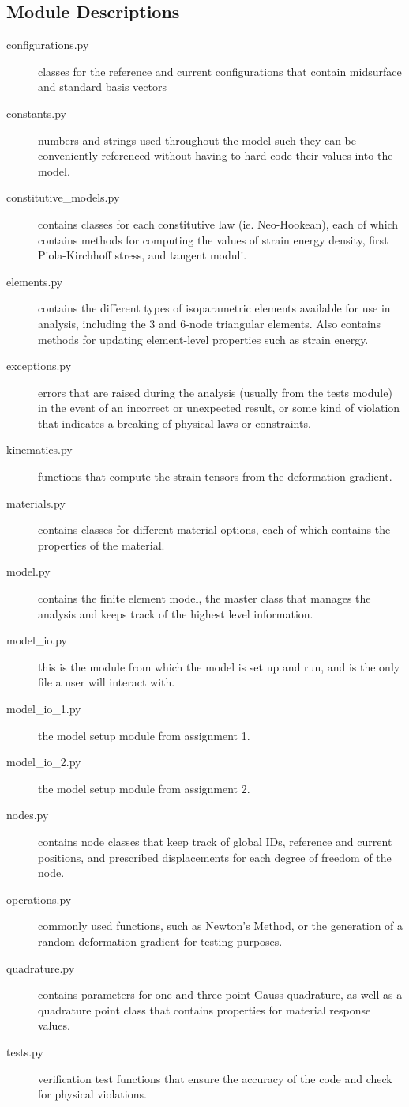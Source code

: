 \documentclass[]{spie}  %
\begin{document}
\subsection{Module Descriptions}
\begin{description}
	\item[configurations.py] classes for the reference and current configurations that contain midsurface and standard basis vectors
	\item[constants.py] numbers and strings used throughout the model such they can be conveniently referenced without having to hard-code their values into the model.
	\item[constitutive\_models.py] contains classes for each constitutive law (ie. Neo-Hookean), each of which contains methods for computing the values of strain energy density, first Piola-Kirchhoff stress, and tangent moduli.
	\item[elements.py] contains the different types of isoparametric elements available for use in analysis, including the 3 and 6-node triangular elements. Also contains methods for updating element-level properties such as strain energy. 
	\item[exceptions.py] errors that are raised during the analysis (usually from the tests module) in the event of an incorrect or unexpected result, or some kind of violation that indicates a breaking of physical laws or constraints.
	\item[kinematics.py] functions that compute the strain tensors from the deformation gradient. 
	\item[materials.py] contains classes for different material options, each of which contains the properties of the material.
	\item[model.py] contains the finite element model, the master class that manages the analysis and keeps track of the highest level information. 
	\item[model\_io.py] this is the module from which the model is set up and run, and is the only file a user will interact with. 
	\item[model\_io\_1.py] the model setup module from assignment 1.
	\item[model\_io\_2.py] the model setup module from assignment 2.
	\item[nodes.py] contains node classes that keep track of global IDs, reference and current positions, and prescribed displacements for each degree of freedom of the node. 
	\item[operations.py] commonly used functions, such as Newton's Method, or the generation of a random deformation gradient for testing purposes. 
	\item[quadrature.py] contains parameters for one and three point Gauss quadrature, as well as a quadrature point class that contains properties for material response values. 
	\item[tests.py] verification test functions that ensure the accuracy of the code and check for physical violations.
\end{description}
\end{document}
